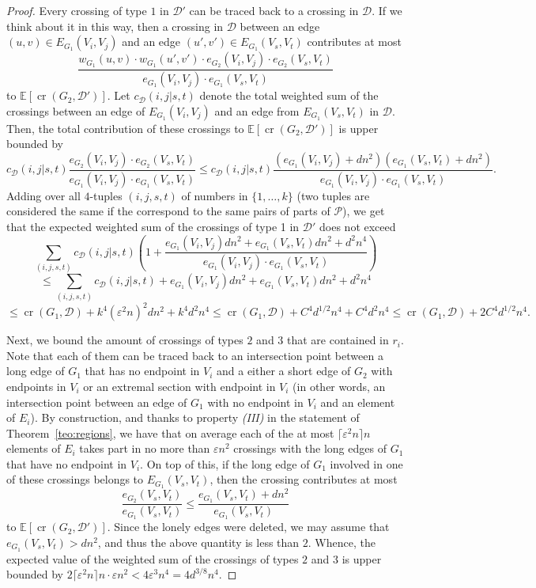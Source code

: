 \documentclass{article}
\begin{document}
\begin{proof}
    Every crossing of type $1$ in $\mathcal{D}'$ can be traced back to a crossing in $\mathcal{D}$. If we think about it in this way, then a crossing in $\mathcal{D}$ between an edge $(u,v)\in E_{G_1}(V_i,V_j)$ and an edge $(u',v')\in E_{G_1}(V_s,V_t)$ contributes at most \[\frac{w_{G_1}(u,v)\cdot w_{G_1}(u',v')\cdot e_{G_2}(V_i,V_j)\cdot e_{G_2}(V_s,V_t)}{e_{G_1}(V_i,V_j)\cdot e_{G_1}(V_s,V_t)}\] to $\mathbb{E}[\mathop{\mathrm{cr}}(G_2,\mathcal{D}')]$. Let $c_\mathcal{D}(i,j|s,t)$ denote the total weighted sum of the crossings between an edge of $E_{G_1}(V_i,V_j)$ and an edge from $E_{G_1}(V_s,V_t)$ in $\mathcal{D}$. Then, the total contribution of these crossings to $\mathbb{E}[\mathop{\mathrm{cr}}(G_2,\mathcal{D}')]$ is upper bounded by \[c_\mathcal{D}(i,j|s,t)\frac{e_{G_2}(V_i,V_j)\cdot e_{G_2}(V_s,V_t)}{e_{G_1}(V_i,V_j)\cdot e_{G_1}(V_s,V_t)}\leq c_\mathcal{D}(i,j|s,t)\frac{(e_{G_1}(V_i,V_j)+d n^2)(e_{G_1}(V_s,V_t)+d n^2)}{e_{G_1}(V_i,V_j)\cdot e_{G_1}(V_s,V_t)}.\] Adding over all $4$-tuples $(i,j,s,t)$ of numbers in $\{1,\dots,k\}$ (two tuples are considered the same if the correspond to the same pairs of parts of $\mathcal{P}$), we get that the expected weighted sum of the crossings of type 1 in $\mathcal{D}'$ does not exceed \[\sum_{(i,j,s,t)}c_\mathcal{D}(i,j|s,t)\left(1+\frac{e_{G_1}(V_i,V_j)d n^2+e_{G_1}(V_s,V_t)d n^2+d^2n^4}{e_{G_1}(V_i,V_j)\cdot e_{G_1}(V_s,V_t)}\right)\] \[\leq\sum_{(i,j,s,t)}c_\mathcal{D}(i,j|s,t)+e_{G_1}(V_i,V_j)d n^2+e_{G_1}(V_s,V_t)d n^2+d^2n^4\] \[\leq\mathop{\mathrm{cr}}(G_1,\mathcal{D})+k^4(\varepsilon^2 n)^2 d n^2+k^4d^2n^4\leq\mathop{\mathrm{cr}}(G_1,\mathcal{D})+C^4d^{1/2}n^4+C^4d^2n^4\leq\mathop{\mathrm{cr}}(G_1,\mathcal{D})+2C^4d^{1/2}n^4.\]

    Next, we bound the amount of crossings of types $2$ and $3$ that are contained in $r_i$. Note that each of them can be traced back to an intersection point between a long edge of $G_1$ that has no endpoint in $V_i$ and a either a short edge of $G_2$ with endpoints in $V_i$ or an extremal section with endpoint in $V_i$ (in other words, an intersection point between an edge of $G_1$ with no endpoint in $V_i$ and an element of $E_i$). By construction, and thanks to property \textit{(III)} in the statement of Theorem~\ref{teo:regions}, we have  that on average each of the at most $\lceil\varepsilon^2 n\rceil n$ elements of $E_i$ takes part in no more than $\varepsilon n^2$ crossings with the long edges of $G_1$ that have no endpoint in $V_i$. On top of this, if the long edge of $G_1$ involved in one of these crossings belongs to $E_{G_1}(V_s,V_t)$, then the crossing contributes at most \[\frac{e_{G_2}(V_s,V_t)}{e_{G_1}(V_s,V_t)}\leq\frac{e_{G_1}(V_s,V_t)+dn^2}{e_{G_1}(V_s,V_t)}\] to $\mathbb{E}[\mathop{\mathrm{cr}}(G_2,\mathcal{D}')]$. Since the lonely edges were deleted, we may assume that $e_{G_1}(V_s,V_t)> dn^2$, and thus the above quantity is less than $2$. Whence, the expected value of the weighted sum of the crossings of types $2$ and $3$ is upper bounded by $2\lceil\varepsilon^2n\rceil n\cdot\varepsilon n^2<4\varepsilon^3n^4=4d^{3/8}n^4$.


\end{proof}
\end{document}
